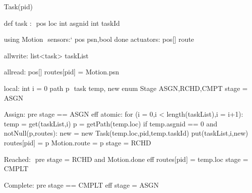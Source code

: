 Task(pid)

def task : $\label{taskdef}$
    pos loc
    int asgnid
    int taskId

using Motion $\label{moddef}$
    sensors:`
       pos psn,bool done
    actuators:
       pos[] route

allwrite:$\label{awvar}$
   list<task> taskList
 
allread:$\label{arvar}$
   pos[] routes[pid] = Motion.psn

local:
   int i = 0 
   path p $\label{pathvar}$
   task temp, new
   enum Stage {ASGN,RCHD,CMPT} stage = ASGN
   
Assign:$\label{asgnevent}$
  pre stage == ASGN
  eff atomic:
    for (i = 0,i < length(taskList),i = i+1):
        temp = get(taskList,i)
        p = getPath(temp.loc)
        if temp.asgnid == 0 and notNull(p,routes):
           new = new Task(temp.loc,pid,temp.taskId)
           put(taskList,i,new)
           routes[pid] = p
           Motion.route = p 
           stage = RCHD          
   
Reached: $\label{rchevent}$
  pre stage = RCHD and Motion.done
  eff routes[pid] = temp.loc
      stage = CMPLT

Complete:$\label{cmpltevent}$
  pre stage == CMPLT
  eff stage = ASGN